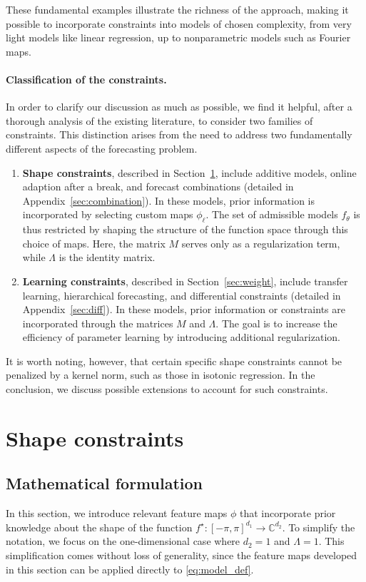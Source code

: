 These fundamental examples illustrate the richness of the approach, making it possible to incorporate constraints into models of chosen complexity, from very light models like linear regression, up to nonparametric models such as Fourier maps. 


\paragraph{Classification of the constraints.} In order to clarify our discussion as much as possible, we find it helpful, after a thorough analysis of the existing literature, to consider two families of constraints. This distinction arises from the need to address two fundamentally different aspects of the forecasting problem.
\begin{enumerate}
\item {\bf Shape constraints}, described in Section~\ref{sec:shape}, include additive models, online adaption after a break, and forecast combinations (detailed in Appendix~\ref{sec:combination}). In these models, prior information is incorporated by selecting custom maps $\phi_\ell$. The set of admissible models  $f_\theta$ is thus restricted by shaping the structure of the function space through this choice of maps. Here, the matrix $M$ serves only as a regularization term, while $\Lambda$ is the identity matrix.


\item {\bf Learning constraints}, described in Section~\ref{sec:weight}, include transfer learning, hierarchical forecasting, and differential constraints (detailed in Appendix~\ref{sec:diff}). In these models, prior information or constraints are incorporated through the matrices $M$ and $\Lambda$. The goal is to increase the efficiency of parameter learning by introducing additional regularization.
\end{enumerate}
It is worth noting, however, that certain specific shape constraints cannot be penalized by a kernel norm, such as those in isotonic regression. In the conclusion, we discuss possible extensions to account for such constraints.

\section{Shape constraints}
\label{sec:shape}
\subsection{Mathematical formulation}
In this section, we introduce relevant feature maps $\phi$ that incorporate prior knowledge about the shape of the function  $f^\star:[-\pi,\pi]^{d_1}\to \mathbb{C}^{d_2}$. To simplify the notation, we focus on the one-dimensional case where $d_2 = 1$ and $\Lambda = 1$. 
This simplification comes without loss of generality, since the feature maps developed in this section can be applied directly to \eqref{eq:model_def}.

